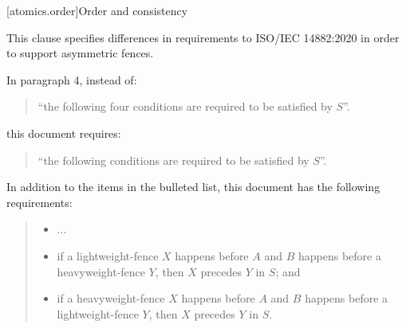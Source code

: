 

\setcounter{chapter}{33}
\setcounter{section}{5}
\setcounter{subsection}{3}
[atomics.order]{Order and consistency}

This clause specifies differences in requirements to ISO/IEC 14882:2020
in order to support asymmetric fences.

In  paragraph 4, instead of:

\begin{quote}
``the following four conditions are required to be satisfied by $S$''.
\end{quote}

this document requires:

\begin{quote}
``the following conditions are required to be satisfied by $S$''.
\end{quote}

In addition to the items in the bulleted list, this document has the
following requirements:
\begin{quote}
\begin{itemize}
\item
  ...
\item
if a  lightweight-fence $X$ happens before $A$ and $B$ happens
before a  heavyweight-fence $Y$, then $X$ precedes $Y$ in $S$; and
\item  if a  heavyweight-fence $X$ happens before $A$ and $B$ happens
before a  lightweight-fence $Y$, then $X$ precedes $Y$ in $S$.
\end{itemize}
\end{quote}
